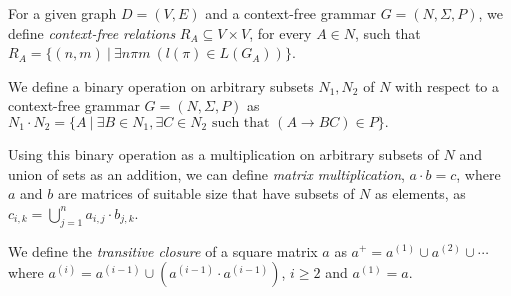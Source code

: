 For a given graph $D = (V, E)$ and a context-free grammar $G = (N, \Sigma, P)$, we define \textit{context-free relations} $R_A \subseteq V \times V$, for every $A \in N$, such that $R_A = \{(n,m)~|~\exists n \pi m~(l(\pi) \in L(G_A))\}$.

We define a binary operation on arbitrary subsets $N_1 , N_2$ of $N$ with respect to a context-free grammar $G = (N, \Sigma, P)$ as $N_1 \cdot N_2 = \{A~|~\exists B \in N_1, \exists C \in N_2 \text{ such that }(A \rightarrow B C) \in P\}.$

Using this binary operation as a multiplication on arbitrary subsets of $N$ and union of sets as an addition, we can define \textit{matrix multiplication}, $a \cdot b = c$, where $a$ and $b$ are matrices of suitable size that have subsets of $N$ as elements, as $c_{i,k} = \bigcup^{n}_{j=1}{a_{i,j} \cdot b_{j,k}}$.

We define the \textit{transitive closure} of a square matrix $a$ as $a^+ = a^{(1)} \cup a^{(2)} \cup \cdots$ where $a^{(i)} = a^{(i-1)} \cup (a^{(i-1)} \cdot a^{(i-1)})$, $i \ge 2$ and $a^{(1)} = a$.
